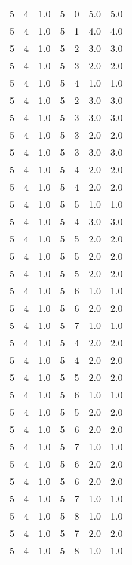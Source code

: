 \documentclass[a4paper,12pt]{article}
\begin{document}
\begin{center}
\begin{longtable}{ c c c | c c c | c }
        5 & 4 & 1.0 & 5 & 0 & 5.0 & 5.0 \\
        5 & 4 & 1.0 & 5 & 1 & 4.0 & 4.0 \\
        5 & 4 & 1.0 & 5 & 2 & 3.0 & 3.0 \\
        5 & 4 & 1.0 & 5 & 3 & 2.0 & 2.0 \\
        5 & 4 & 1.0 & 5 & 4 & 1.0 & 1.0 \\
        5 & 4 & 1.0 & 5 & 2 & 3.0 & 3.0 \\
        5 & 4 & 1.0 & 5 & 3 & 3.0 & 3.0 \\
        5 & 4 & 1.0 & 5 & 3 & 2.0 & 2.0 \\
        5 & 4 & 1.0 & 5 & 3 & 3.0 & 3.0 \\
        5 & 4 & 1.0 & 5 & 4 & 2.0 & 2.0 \\
        5 & 4 & 1.0 & 5 & 4 & 2.0 & 2.0 \\
        5 & 4 & 1.0 & 5 & 5 & 1.0 & 1.0 \\
        5 & 4 & 1.0 & 5 & 4 & 3.0 & 3.0 \\
        5 & 4 & 1.0 & 5 & 5 & 2.0 & 2.0 \\
        5 & 4 & 1.0 & 5 & 5 & 2.0 & 2.0 \\
        5 & 4 & 1.0 & 5 & 5 & 2.0 & 2.0 \\
        5 & 4 & 1.0 & 5 & 6 & 1.0 & 1.0 \\
        5 & 4 & 1.0 & 5 & 6 & 2.0 & 2.0 \\
        5 & 4 & 1.0 & 5 & 7 & 1.0 & 1.0 \\
        5 & 4 & 1.0 & 5 & 4 & 2.0 & 2.0 \\
        5 & 4 & 1.0 & 5 & 4 & 2.0 & 2.0 \\
        5 & 4 & 1.0 & 5 & 5 & 2.0 & 2.0 \\
        5 & 4 & 1.0 & 5 & 6 & 1.0 & 1.0 \\
        5 & 4 & 1.0 & 5 & 5 & 2.0 & 2.0 \\
        5 & 4 & 1.0 & 5 & 6 & 2.0 & 2.0 \\
        5 & 4 & 1.0 & 5 & 7 & 1.0 & 1.0 \\
        5 & 4 & 1.0 & 5 & 6 & 2.0 & 2.0 \\
        5 & 4 & 1.0 & 5 & 6 & 2.0 & 2.0 \\
        5 & 4 & 1.0 & 5 & 7 & 1.0 & 1.0 \\
        5 & 4 & 1.0 & 5 & 8 & 1.0 & 1.0 \\
        5 & 4 & 1.0 & 5 & 7 & 2.0 & 2.0 \\
        5 & 4 & 1.0 & 5 & 8 & 1.0 & 1.0 \\

\end{longtable}
\end{center}
\end{document}
